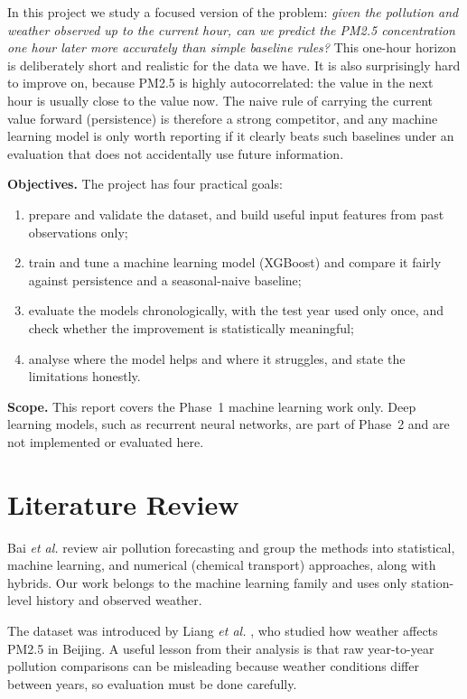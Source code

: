 \documentclass[onecolumn,11pt,journal]{IEEEtran}
\begin{document}
In this project we study a focused version of the problem: \emph{given the pollution and weather observed up to the current hour, can we predict the PM2.5 concentration one hour later more accurately than simple baseline rules?} This one-hour horizon is deliberately short and realistic for the data we have. It is also surprisingly hard to improve on, because PM2.5 is highly autocorrelated: the value in the next hour is usually close to the value now. The naive rule of carrying the current value forward (persistence) is therefore a strong competitor, and any machine learning model is only worth reporting if it clearly beats such baselines under an evaluation that does not accidentally use future information.

\textbf{Objectives.} The project has four practical goals:
\begin{enumerate}
\item prepare and validate the dataset, and build useful input features from past observations only;
\item train and tune a machine learning model (XGBoost) and compare it fairly against persistence and a seasonal-naive baseline;
\item evaluate the models chronologically, with the test year used only once, and check whether the improvement is statistically meaningful;
\item analyse where the model helps and where it struggles, and state the limitations honestly.
\end{enumerate}

\textbf{Scope.} This report covers the Phase~1 machine learning work only. Deep learning models, such as recurrent neural networks, are part of Phase~2 and are not implemented or evaluated here.

\section{Literature Review}
Bai \emph{et al.} \cite{bai2018} review air pollution forecasting and group the methods into statistical, machine learning, and numerical (chemical transport) approaches, along with hybrids. Our work belongs to the machine learning family and uses only station-level history and observed weather.

The dataset was introduced by Liang \emph{et al.} \cite{liang2015,uci_beijing}, who studied how weather affects PM2.5 in Beijing. A useful lesson from their analysis is that raw year-to-year pollution comparisons can be misleading because weather conditions differ between years, so evaluation must be done carefully.
\end{document}
